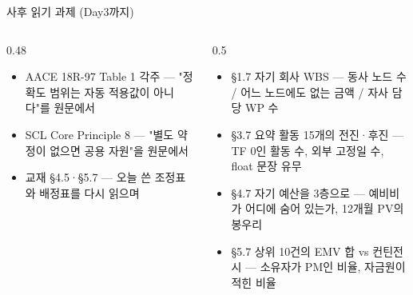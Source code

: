 \begin{frame}{사후 읽기 과제 (Day3까지)}
\begin{columns}[T]
\begin{column}{0.48\textwidth}
\begin{itemize}
\item AACE 18R-97 Table 1 각주 — "정확도 범위는 자동 적용값이 아니다"를 원문에서
\item SCL Core Principle 8 — "별도 약정이 없으면 공용 자원"을 원문에서
\item 교재 §4.5·§5.7 — 오늘 쓴 조정표와 배정표를 다시 읽으며
\end{itemize}
\end{column}
\begin{column}{0.5\textwidth}
\begin{itemize}
\item §1.7 자기 회사 WBS — 동사 노드 수 / 어느 노드에도 없는 금액 / 자사 담당 WP 수
\item §3.7 요약 활동 15개의 전진·후진 — TF 0인 활동 수, 외부 고정일 수, float 문장 유무
\item §4.7 자기 예산을 3층으로 — 예비비가 어디에 숨어 있는가, 12개월 PV의 봉우리
\item §5.7 상위 10건의 EMV 합 vs 컨틴전시 — 소유자가 PM인 비율, 자금원이 적힌 비율
\end{itemize}
\end{column}
\end{columns}
\end{frame}

